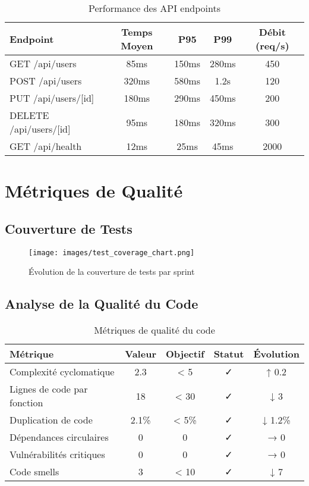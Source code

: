 \begin{table}[H]
    \centering
    \begin{tabularx}{\textwidth}{|l|c|c|c|c|}
        \hline
        \textbf{Endpoint} & \textbf{Temps Moyen} & \textbf{P95} & \textbf{P99} & \textbf{Débit (req/s)} \\
        \hline
        GET /api/users & 85ms & 150ms & 280ms & 450 \\
        \hline
        POST /api/users & 320ms & 580ms & 1.2s & 120 \\
        \hline
        PUT /api/users/[id] & 180ms & 290ms & 450ms & 200 \\
        \hline
        DELETE /api/users/[id] & 95ms & 180ms & 320ms & 300 \\
        \hline
        GET /api/health & 12ms & 25ms & 45ms & 2000 \\
        \hline
    \end{tabularx}
    \caption{Performance des API endpoints}
    \label{tab:api_performance}
\end{table}

\section{Métriques de Qualité}

\subsection{Couverture de Tests}

\begin{figure}[H]
    \centering
    \texttt{[image: images/test\_coverage\_chart.png]}
    \caption{Évolution de la couverture de tests par sprint}
    \label{fig:test_coverage_evolution}
\end{figure}

\subsection{Analyse de la Qualité du Code}

\begin{table}[H]
    \centering
    \begin{tabularx}{\textwidth}{|l|c|c|c|c|}
        \hline
        \textbf{Métrique} & \textbf{Valeur} & \textbf{Objectif} & \textbf{Statut} & \textbf{Évolution} \\
        \hline
        Complexité cyclomatique & 2.3 & < 5 & ✓ & ↑ 0.2 \\
        \hline
        Lignes de code par fonction & 18 & < 30 & ✓ & ↓ 3 \\
        \hline
        Duplication de code & 2.1\% & < 5\% & ✓ & ↓ 1.2\% \\
        \hline
        Dépendances circulaires & 0 & 0 & ✓ & → 0 \\
        \hline
        Vulnérabilités critiques & 0 & 0 & ✓ & → 0 \\
        \hline
        Code smells & 3 & < 10 & ✓ & ↓ 7 \\
        \hline
    \end{tabularx}
    \caption{Métriques de qualité du code}
    \label{tab:code_quality}
\end{table}

